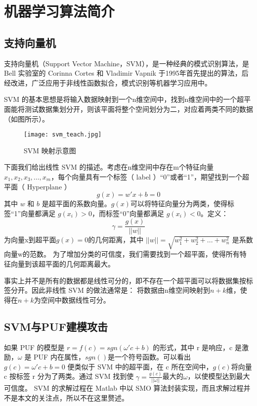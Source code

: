 \section{机器学习算法简介}

\subsection{支持向量机}
支持向量机（Support Vector Machine，SVM），是一种经典的模式识别算法，是 Bell 实验室的 Corinna Cortes 和 Vladimir Vapnik 于1995年首先提出的算法，后经改进，广泛应用于非线性函数拟合，模式识别等机器学习应用中\supercite{cortes1995support}。

SVM 的基本思想是将输入数据映射到一个n维空间中，找到n维空间中的一个超平面能将测试数据集划分开，则该平面将整个空间划分为二，对应着两类不同的数据（如图所示）。

\begin{figure}[h]
\centering
\texttt{[image: svm\_teach.jpg]}
\caption{SVM 映射示意图}
\label{fig:svm_proj}
\end{figure}

下面我们给出线性 SVM 的描述。考虑在n维空间中存在m个特征向量 $ x_1,x_2,x_3,…,x_m $，每个向量具有一个标签（ label ）``0''或者``1''，期望找到一个超平面（ Hyperplane ）
\begin{equation}
g(x)=w'x+b=0
\end{equation}
其中 $ w $ 和 $ b $ 是超平面的系数向量。$ g(x) $可以将特征向量分为两类，使得标签``1''向量都满足 $ g(x_i )>0 $，而标签``0''向量都满足 $ g(x_i )<0 $。定义：
\begin{equation}
\gamma=\frac{g(x)}{||w||}
\end{equation}
为向量x到超平面$ g(x)=0 $的几何距离，其中
$ ||w||=\sqrt{w_1^2+w_2^2+...+w_n^2} $
是系数向量w的范数。
为了增加分类的可信度，我们需要找到一个超平面，使得所有特征向量到该超平面的几何距离最大。

事实上并不是所有的数据都是线性可分的，即不存在一个超平面可以将数据集按标签分开。因此非线性 SVM 的做法通常是：
将数据由n维空间映射到$ n+k $维，使得在$ n+k $为空间中数据线性可分。

\subsection{SVM与PUF建模攻击}
如果 PUF 的模型是 $ r=f(c)=sgn(\omega'c+b) $ 的形式，其中 r 是响应，c 是激励，$ \omega $ 是 PUF 内在属性，$ sgn() $是一个符号函数。可以看出 $ g(c)=\omega'c+b=0 $ 便类似于 SVM 中的超平面，在 c 所在空间中，$ g(c) $将向量 c 按标签 r 分为了两类。通过 SVM 找到使 $ \gamma=\frac{g(c)}{||\omega||} $最大的$ \omega $，以使模型达到最大可信度。 SVM 的求解过程在 Matlab 中以 SMO 算法封装实现，而且求解过程并不是本文的关注点，所以不在这里赘述。


